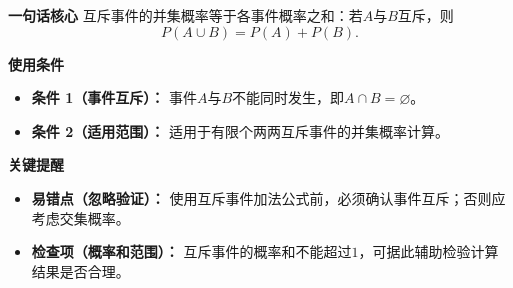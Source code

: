 \begin{summarybox}
	\textbf{\textcolor{CSummary}{一句话核心}}
	互斥事件的并集概率等于各事件概率之和：若$A$与$B$互斥，则
	\[
		P(A\cup B)=P(A)+P(B).
	\]

	\medskip
	\textbf{\textcolor{CSummary}{使用条件}}
	\begin{itemize}[leftmargin=*, itemsep=0.5em, topsep=0.4em]
		\item \textbf{条件 1（事件互斥）：}
		      事件$A$与$B$不能同时发生，即$A\cap B=\varnothing$。

		\item \textbf{条件 2（适用范围）：}
		      适用于有限个两两互斥事件的并集概率计算。
	\end{itemize}

	\medskip
	\textbf{\textcolor{CSummary}{关键提醒}}
	\begin{itemize}[leftmargin=*, itemsep=0.5em, topsep=0.4em]
		\item \textbf{易错点（忽略验证）：}
		      使用互斥事件加法公式前，必须确认事件互斥；否则应考虑交集概率。

		\item \textbf{检查项（概率和范围）：}
		      互斥事件的概率和不能超过$1$，可据此辅助检验计算结果是否合理。
	\end{itemize}
\end{summarybox}